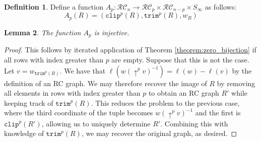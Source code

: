 \documentclass{amsart}
\newtheorem{lemma}{Lemma}[subsection]
\theoremstyle{definition}
\newtheorem{definition}[lemma]{Definition}
\theoremstyle{remark}
\numberwithin{equation}{subsection}
\newcommand{\shup}{{\uparrow}}
\newcommand{\wof}[1]{w_{#1}}
\newcommand{\trm}{\mathtt{trim}}
\newcommand{\clp}{\mathtt{clip}}
\newcommand{\RC}{\mathcal{RC}}
\begin{document}
\begin{definition}
Define a function $A_p:\RC_n\to\RC_{p}\times \RC_{n - p}\times S_\infty$ as follows:
$$A_p(R) = (\clp^{p}(R), \trm^p(R),\wof{R})$$
\end{definition}

\begin{lemma} \label{lemma:injap}
The function $A_p$ is injective.
\end{lemma}
\begin{proof}
This follows by iterated application of Theorem \ref{theorem:zero_bijection} if all rows with index greater than $p$ are empty. Suppose that this is not the case. Let $v=\wof{\trm^p(R)}$. We have that $\ell(w(\shup^p v)^{-1}) = \ell(w) - \ell(v)$ by the definition of an RC graph. We may therefore recover the image of $R$ by removing all elements in rows with index greater than $p$ to obtain an RC graph $R'$ while keeping track of $\trm^p(R)$. This reduces the problem to the previous case, where the third coordinate of the tuple becomes $w(\shup^p v)^{-1}$ and the first is $\clp^p(R')$, allowing us to uniquely determine $R'$. Combining this with knowledge of $\trm^p(R)$, we may recover the original graph, as desired.
\end{proof}
\end{document}
